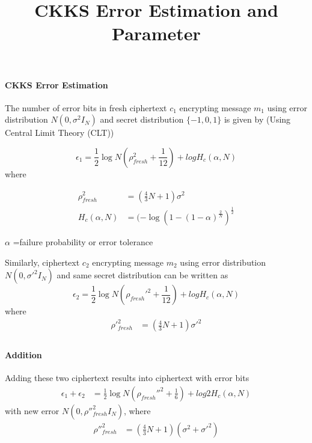 \documentclass[a4paper,10pt]{article}
\title{CKKS Error Estimation and Parameter}
\author{}
\date{}
\begin{document}
\maketitle

\paragraph{CKKS Error Estimation}
The number of error bits in fresh ciphertext $c_1$ encrypting message $m_1$ using error distribution $N(0,\sigma^2 I_N)$ and secret distribution $\{-1,0,1\}$ is given by (Using Central Limit Theory (CLT))

\begin{equation}
 \epsilon_1 = \frac{1}{2}\log N(\rho_{fresh}^2+\frac{1}{12}) + log H_c (\alpha,N)
\end{equation}
where

\begin{align*}
    \rho^2_{fresh}&=(\frac{4}{3}N+1)\sigma^2 \\
    H_c (\alpha,N)&=(-\log (1-(1-\alpha)^\frac{2}{N})^\frac{1}{2}
\end{align*}

$\alpha$ =failure probability or error tolerance

Similarly, ciphertext $c_2$ encrypting message $m_2$ using error distribution $N(0,\sigma'^2 I_N)$ and same secret distribution can be written as
\begin{equation}
 \epsilon_2 = \frac{1}{2}\log N(\rho_{fresh}'^2+\frac{1}{12}) + log H_c (\alpha,N)
\end{equation}
where
\begin{align*}
    \rho'^2_{fresh}&=(\frac{4}{3}N+1)\sigma'^2 \\
\end{align*}

\paragraph{Addition} Adding these two ciphertext results into ciphertext with error bits
\begin{align}
  \epsilon_1+\epsilon_2 &= \frac{1}{2}\log N(\rho_{fresh}''^2+\frac{1}{6}) + log 2H_c (\alpha,N)
\end{align}
with new error $N(0,\rho''^2_{fresh}I_N)$, where
\begin{align*}
    \rho''^2_{fresh}&=(\frac{4}{3}N+1)(\sigma^2+\sigma'^2) \\
\end{align*}
\end{document}
